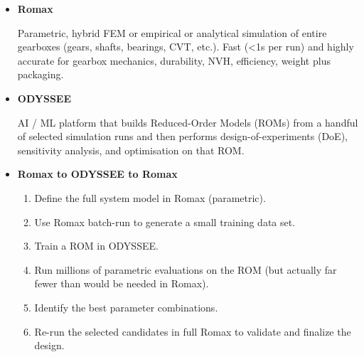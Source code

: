         \begin{itemize}
            \item \textbf{Romax}\par
                Parametric, hybrid FEM or empirical or analytical simulation of entire gearboxes 
                (gears, shafts, bearings, CVT, etc.). Fast (<1s per run) and highly accurate for gearbox 
                mechanics, durability, NVH, efficiency, weight plus packaging.
            \item \textbf{ODYSSEE}\par
                AI / ML platform that builds Reduced-Order Models (ROMs) from a handful of selected 
                simulation runs and then performs design-of-experiments (DoE), sensitivity analysis, 
                and optimisation on that ROM.
            \item \textbf{Romax to ODYSSEE to Romax}\par
                \begin{enumerate}
                    \item Define the full system model in Romax (parametric).
                    \item Use Romax batch-run to generate a small training data set.
                    \item Train a ROM in ODYSSEE.
                    \item Run millions of parametric evaluations on the ROM (but actually far fewer than would be needed in Romax).
                    \item Identify the best parameter combinations.
                    \item Re-run the selected candidates in full Romax to validate and finalize the design.
                \end{enumerate}
        \end{itemize}